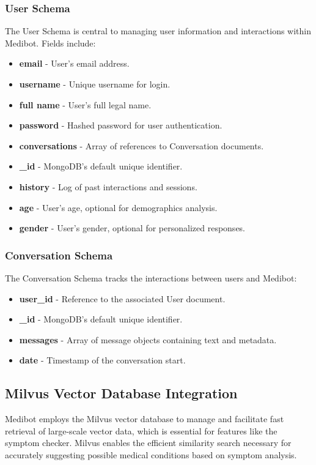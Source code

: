 \subsubsection{User Schema}
The User Schema is central to managing user information and interactions within Medibot. Fields include:
\begin{itemize}
    \item \textbf{email} - User's email address.
    \item \textbf{username} - Unique username for login.
    \item \textbf{full name} - User's full legal name.
    \item \textbf{password} - Hashed password for user authentication.
    \item \textbf{conversations} - Array of references to Conversation documents.
    \item \textbf{\_id} - MongoDB's default unique identifier.
    \item \textbf{history} - Log of past interactions and sessions.
    \item \textbf{age} - User's age, optional for demographics analysis.
    \item \textbf{gender} - User's gender, optional for personalized responses.
\end{itemize}

\subsubsection{Conversation Schema}
The Conversation Schema tracks the interactions between users and Medibot:
\begin{itemize}
    \item \textbf{user\_id} - Reference to the associated User document.
    \item \textbf{\_id} - MongoDB's default unique identifier.
    \item \textbf{messages} - Array of message objects containing text and metadata.
    \item \textbf{date} - Timestamp of the conversation start.
\end{itemize}

\subsection{Milvus Vector Database Integration}
Medibot employs the Milvus vector database to manage and facilitate fast retrieval of large-scale vector data, which is essential for features like the symptom checker. Milvus enables the efficient similarity search necessary for accurately suggesting possible medical conditions based on symptom analysis.

